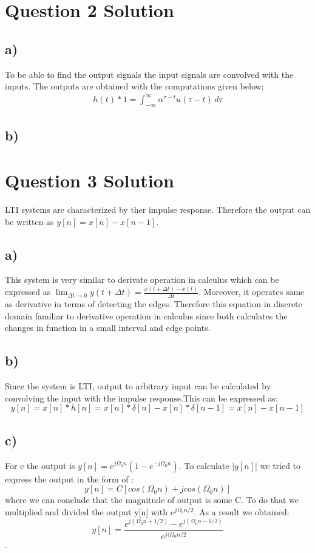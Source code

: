 \documentclass[letterpaper,12pt]{article}
\begin{document}
\section{Question 2 Solution}
\subsection{a)}
To be able to find the output signals the input signals are convolved with the inputs. The outputs are obtained with the computations given below;
\begin{equation}
    \begin{split}
        h(t) \ast 1 = \int_{-\infty}^{\infty} \alpha^{\tau-t} u(\tau-t)  \,d\tau  
    \end{split}
\end{equation}
\subsection{b)}
\section{Question 3 Solution}
LTI systems are characterized by ther impulse response. Therefore the output can be written as \(y[n] = x[n] - x[n-1]\).


\subsection{a)}
This system is very similar to derivate operation in calculus which can be expressed as    \(\lim_{\Delta t \to 0} y(t+ \Delta t) = \frac{x(t+ \Delta t) - x(t)}{\Delta t}\).
  Moreover, it operates same as derivative in terms of detecting the edges. Therefore this equation in discrete domain familiar to derivative operation in calculus since both calculates the changes in function in a small interval and edge points.
\subsection{b)}
Since the system is LTI, output to arbitrary input can be calculated by convolving the input with the impulse response.This can be expressed as: \newline
 \[y[n]= x[n] * h[n] = x[n]* \delta [n] - x[n] * \delta [n-1]= x[n]- x[n-1]\]
\subsection{c)}
For c the output is \( y[n]= e^{j \Omega_0 n} (1-e^{-j \Omega_0 n})\).\newline
To calculate $|y[n]|$ we tried to express the output in the form of :
\[y[n]=C[cos(\Omega_0 n) + jcos(\Omega_0 n)]\] where we can conclude that the magnitude of output is some C. To do that we multiplied and divided the output y[n] with \(e^{j \Omega_0 n/2}\).
As a result we obtained:
 \[y[n]=\frac{e^{j (\Omega_0 n+1/2)}-e^{j (\Omega_0 n-1/2)}}{e^{j (\Omega_0 n/2}}\].
\end{document}
